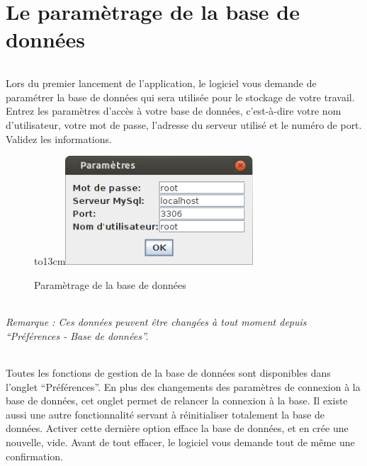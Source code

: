 \documentclass[a4paper,10pt]{report}
\begin{document}
\part{Le paramètrage de la base de données}
  \paragraph{}
    Lors du premier lancement de l'application, le logiciel vous demande de paramétrer la base de données qui sera utilisée pour le stockage de votre travail.
    Entrez les paramètres d'accès à votre base de données, c'est-à-dire votre nom d'utilisateur, votre mot de passe, l'adresse du serveur utilisé et le numéro de port.
    Validez les informations.
    
  
   \begin{figure}[!h]
     \begin{center}
	  \hbox to13cm{\hss\includegraphics[width=7cm]{../general/parametres_bdd.png}\hss}
	  \caption{Paramètrage de la base de données}
     \end{center}
   \end{figure}
  

  
    
  \paragraph{}
      \textit{Remarque : Ces données peuvent être changées à tout moment depuis ``Préférences - Base de données''.}
  
  \paragraph{}
    Toutes les fonctions de gestion de la base de données sont disponibles dans l'onglet ``Préférences''.
    En plus des changements des paramètres de connexion à la base de données, cet onglet permet de relancer la connexion à la base.
    Il existe aussi une autre fonctionnalité servant à réinitialiser totalement la base de données.
    Activer cette dernière option efface la base de données, et en crée une nouvelle, vide.
    Avant de tout effacer, le logiciel vous demande tout de même une confirmation.
  
\end{document}
